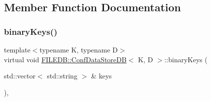 \subsection{Member Function Documentation}
\mbox{\label{classFILEDB_1_1ConfDataStoreDB_a1d0e8e27cd8fc6b24ece52259d1ab2b0}} 
\subsubsection{\texorpdfstring{binaryKeys()}{binaryKeys()}\hspace{0.1cm}{\footnotesize\ttfamily [1/3]}}
{\footnotesize\ttfamily template$<$typename K, typename D$>$ \\
virtual void \mbox{\hyperlink{classFILEDB_1_1ConfDataStoreDB}{F\+I\+L\+E\+D\+B\+::\+Conf\+Data\+Store\+DB}}$<$ K, D $>$\+::binary\+Keys (\begin{DoxyParamCaption}\item[{std\+::vector$<$ std\+::string $>$ \&}]{keys }\end{DoxyParamCaption})\hspace{0.3cm}{\ttfamily [inline]}, {\ttfamily [virtual]}}

